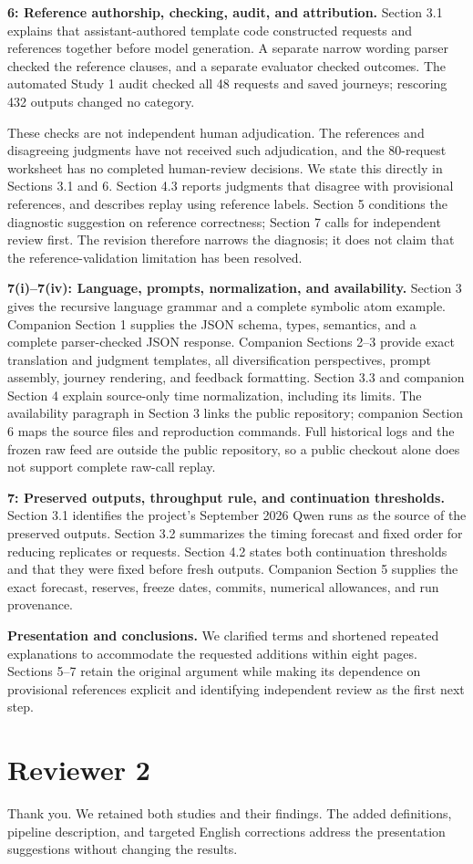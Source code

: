 \documentclass[11pt,a4paper]{scrartcl}
\begin{document}
\textbf{6: Reference authorship, checking, audit, and attribution.}
Section 3.1 explains that assistant-authored template code constructed requests and references together before model generation. A separate narrow wording parser checked the reference clauses, and a separate evaluator checked outcomes. The automated Study 1 audit checked all 48 requests and saved journeys; rescoring 432 outputs changed no category.

These checks are not independent human adjudication. The references and disagreeing judgments have not received such adjudication, and the 80-request worksheet has no completed human-review decisions. We state this directly in Sections 3.1 and 6. Section 4.3 reports judgments that disagree with provisional references, and describes replay using reference labels. Section 5 conditions the diagnostic suggestion on reference correctness; Section 7 calls for independent review first. The revision therefore narrows the diagnosis; it does not claim that the reference-validation limitation has been resolved.

\textbf{7(i)--7(iv): Language, prompts, normalization, and availability.}
Section 3 gives the recursive language grammar and a complete symbolic atom example. Companion Section 1 supplies the JSON schema, types, semantics, and a complete parser-checked JSON response. Companion Sections 2--3 provide exact translation and judgment templates, all diversification perspectives, prompt assembly, journey rendering, and feedback formatting. Section 3.3 and companion Section 4 explain source-only time normalization, including its limits. The availability paragraph in Section 3 links the public repository; companion Section 6 maps the source files and reproduction commands. Full historical logs and the frozen raw feed are outside the public repository, so a public checkout alone does not support complete raw-call replay.

\textbf{7: Preserved outputs, throughput rule, and continuation thresholds.}
Section 3.1 identifies the project's September 2026 Qwen runs as the source of the preserved outputs. Section 3.2 summarizes the timing forecast and fixed order for reducing replicates or requests. Section 4.2 states both continuation thresholds and that they were fixed before fresh outputs. Companion Section 5 supplies the exact forecast, reserves, freeze dates, commits, numerical allowances, and run provenance.

\textbf{Presentation and conclusions.}
We clarified terms and shortened repeated explanations to accommodate the requested additions within eight pages. Sections 5--7 retain the original argument while making its dependence on provisional references explicit and identifying independent review as the first next step.

\section*{Reviewer 2}

Thank you. We retained both studies and their findings. The added definitions, pipeline description, and targeted English corrections address the presentation suggestions without changing the results.
\end{document}
